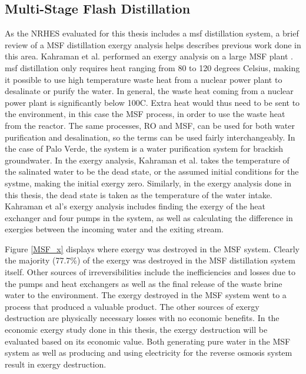 \subsection{Multi-Stage Flash Distillation}
As the NRHES evaluated for this thesis includes a \ac{msf} distillation system, a brief review of a MSF distillation exergy analysis helps describes previous work done in this area. Kahraman et al. performed an exergy analysis on a large MSF plant \cite{Kahraman2005}.  \ac{msf} distillation only requires heat ranging from 80 to 120 degrees Celsius, making it possible to use high temperature waste heat from a nuclear power plant to desalinate or purify the water. In general, the waste heat coming from a nuclear power plant is significantly below 100\degree C. Extra heat would thus need to be sent to the environment, in this case the MSF process, in order to use the waste heat from the reactor. The same processes, RO and MSF, can be used for both water purification and desalination, so the terms can be used fairly interchangeably. In the case of Palo Verde, the system is a water purification system for brackish groundwater. In the exergy analysis, Kahraman et al. takes the temperature of the salinated water to be the dead state, or the assumed initial conditions for the systme, making the initial exergy zero. Similarly, in the exergy analysis done in this thesis, the dead state is taken as the temperature of the water intake. Kahraman et al's exergy analysis includes finding the exergy of the heat exchanger and four pumps in the system, as well as calculating the difference in exergies between the incoming water and the exiting stream.


Figure \ref{MSF_x} displays where exergy was destroyed in the MSF system. Clearly the majority (77.7\%) of the exergy was destroyed in the MSF distillation system itself. Other sources of irreversibilities include the inefficiencies and losses due to the pumps and heat exchangers as well as the final release of the waste brine water to the environment. The exergy destroyed in the MSF system went to a process that produced a valuable product.  The other sources of exergy destruction are physically necessary losses with no economic benefits. In the economic exergy study done in this thesis, the exergy destruction will be evaluated based on its economic value.  Both generating pure water in the MSF system as well as producing and using electricity for the reverse osmosis system result in exergy destruction.

